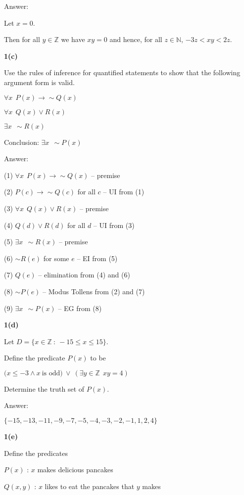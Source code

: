 \documentclass[a4paper,12pt,oneside]{book}
\theoremstyle{definition}
\begin{document}
Answer:

Let $x=0$.

Then for all $y \in \mathbb{Z}$ we have $xy=0$ and hence, for all $z \in \mathbb{N}$, $-3z < xy < 2z$.

\bigskip

\noindent
{\bf 1(c)}

Use the rules of inference for quantified statements to show that the following argument form is valid.

$\forall x \ \ P(x) \longrightarrow \sim Q(x)$

$\forall x \ \ Q(x) \vee R(x)$

$\exists x \ \ \sim R(x)$

Conclusion: $\exists x \ \ \sim P(x)$

Answer:

(1) $\forall x \ \ P(x) \longrightarrow \sim Q(x)$ -- premise

(2) $P(c) \longrightarrow \sim Q(c)$ for all $c$ -- UI from (1)

(3) $\forall x \ \ Q(x) \vee R(x)$ -- premise

(4) $Q(d) \vee R(d)$ for all $d$ -- UI from (3)

(5) $\exists x \ \ \sim R(x)$ -- premise

(6) $\sim R(e)$ for some $e$ -- EI from (5)

(7) $Q(e)$ -- elimination from (4) and (6)

(8) $\sim P(e)$ -- Modus Tollens from (2) and (7)

(9) $\exists x \ \ \sim P(x)$ -- EG from (8)

\bigskip

\noindent
{\bf 1(d)}

Let $D = \{ x \in \mathbb{Z} \ : \ -15 \leq x \leq 15 \}$.

Define the predicate $P(x)$ to be

$( x \leq -3 \wedge x \ \text{is odd)} \ \vee \ (\exists y \in \mathbb{Z} \ \ xy=4)$

Determine the truth set of $P(x)$.

Answer:

$\{ -15, -13, -11, -9, -7, -5, -4, -3, -2, -1, 1, 2, 4 \}$

\bigskip

\noindent
{\bf 1(e)}

Define the predicates 

$P(x)$ : $x$ makes delicious pancakes

$Q(x,y)$ : $x$ likes to eat the pancakes that $y$ makes
\end{document}
